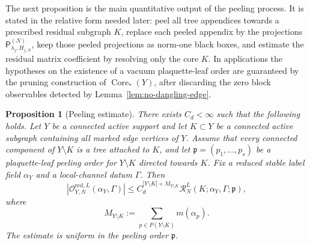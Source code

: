 \documentclass[11pt,a4paper,reqno]{amsart}
\newtheorem{proposition}[theorem]{Proposition}
\theoremstyle{definition}
\theoremstyle{remark}
\begin{document}
The next proposition is the main quantitative output of the peeling process.  It is stated in the relative form needed later: peel all tree appendices towards a prescribed residual subgraph $K$, replace each peeled appendix by the projections $\mathsf P_{\lambda_j,H_{j,N}}^{(N)}$, keep those peeled projections as norm-one black boxes, and estimate the residual matrix coefficient by resolving only the core $K$.  In applications the hypotheses on the existence of a vacuum plaquette-leaf order are guaranteed by the pruning construction of $\operatorname{Core}_*(Y)$, after discarding the zero block observables detected by Lemma~\ref{lem:no-dangling-edge}.

\begin{proposition}[Peeling estimate]\label{prop:relative-peeling}
There exists $C_d<\infty$ such that the following holds.  Let $Y$ be a connected active support and let $K\subset Y$ be a connected active subgraph containing all marked edge vertices of $Y$.  Assume that every connected component of $Y\setminus K$ is a tree attached to $K$, and let $\mathfrak p=(p_1,\ldots,p_s)$ be a plaquette-leaf peeling order for $Y\setminus K$ directed towards $K$.  Fix a reduced stable label field $\alpha_Y$ and a local-channel datum $\Gamma$.  Then
\begin{equation}
\label{eq:relative-peeling}
\left|\mathcal O_{Y,N}^{\mathrm{red},L}(\alpha_Y,\Gamma)\right|
\le
C_d^{|Y\setminus K|+M_{Y\setminus K}}
\mathcal R_N^L(K;\alpha_Y,\Gamma;\mathfrak p),
\end{equation}
where
\[
M_{Y\setminus K}:=\sum_{p\in P(Y\setminus K)}m(\alpha_p).
\]
The estimate is uniform in the peeling order $\mathfrak p$.
\end{proposition}
\end{document}
